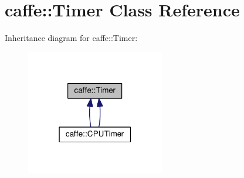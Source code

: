 \hypertarget{classcaffe_1_1_timer}{}\section{caffe\+:\+:Timer Class Reference}
\label{classcaffe_1_1_timer}


Inheritance diagram for caffe\+:\+:Timer\+:
\nopagebreak
\begin{figure}[H]
\begin{center}
\leavevmode
\includegraphics[width=171pt]{classcaffe_1_1_timer__inherit__graph}
\end{center}
\end{figure}
